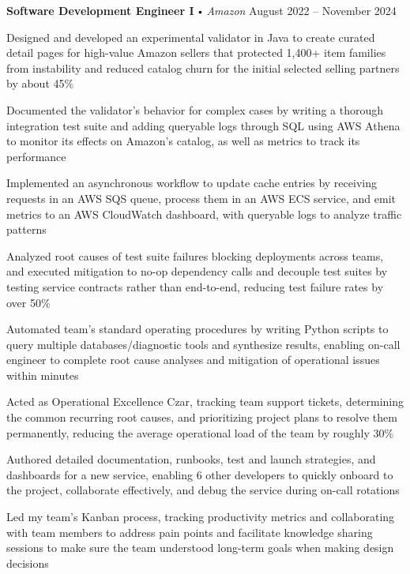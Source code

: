 \documentclass{article}
\newcommand{\employer}[4]{
\textbf{#1} \labelitemi \textit{#2} \hfill #3 \\ #4 \vspace*{3pt}
}
\renewcommand{\labelitemi}{
$\vcenter{\hbox{\tiny$\bullet$}}$\hspace*{3pt}
}
\renewcommand{\labelitemii}{
$\vcenter{\hbox{\tiny$\bullet$}}$\hspace*{-3pt}
}
\newenvironment{bullet-list-minor}{
\begin{list}{\labelitemii}{\setlength\leftmargin{15pt} 
\topsep 0pt \itemsep 1pt}}{\vspace*{4pt}\end{list}
}
\begin{document}
    \employer{Software Development Engineer I}{Amazon}{August 2022 -- November 2024}{}
    \smallskip
	\begin{bullet-list-minor}
        \item Designed and developed an experimental validator in Java to create curated detail pages for high-value Amazon sellers that protected 1,400+ item families from instability and reduced catalog churn for the initial selected selling partners by about 45\%
        \item Documented the validator's behavior for complex cases by writing a thorough integration test suite and adding queryable logs through SQL using AWS Athena to monitor its effects on Amazon's catalog, as well as metrics to track its performance
        \item Implemented an asynchronous workflow to update cache entries by receiving requests in an AWS SQS queue, process them in an AWS ECS service, and emit metrics to an AWS CloudWatch dashboard, with queryable logs to analyze traffic patterns
        \item Analyzed root causes of test suite failures blocking deployments across teams, and executed mitigation to no-op dependency calls and decouple test suites by testing service contracts rather than end-to-end, reducing test failure rates by over 50\%
        \item Automated team's standard operating procedures by writing Python scripts to query multiple databases/diagnostic tools and synthesize results, enabling on-call engineer to complete root cause analyses and mitigation of operational issues within minutes
        \item Acted as Operational Excellence Czar, tracking team support tickets, determining the common recurring root causes, and prioritizing project plans to resolve them permanently, reducing the average operational load of the team by roughly 30\%
        \item Authored detailed documentation, runbooks, test and launch strategies, and dashboards for a new service, enabling 6 other developers to quickly onboard to the project, collaborate effectively, and debug the service during on-call rotations
        \item Led my team's Kanban process, tracking productivity metrics and collaborating with team members to address pain points and facilitate knowledge sharing sessions to make sure the team understood long-term goals when making design decisions
    \end{bullet-list-minor}
    \medskip
    \smallskip
    
\end{document}

